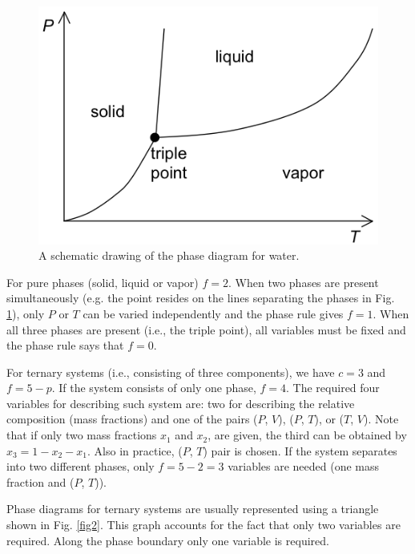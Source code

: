 \documentclass[byrevtex,amssymb,aps,pra,floatfix,letterpaper]{revtex4}
\begin{document}
\begin{figure}[!htp]
\begin{center}
\includegraphics[scale=0.5]{fig1}
\caption{A schematic drawing of the phase diagram for water.}
\label{fig1}
\end{center}
\end{figure}

For pure phases (solid, liquid or vapor) $f = 2$. When two phases are present simultaneously (e.g. the point resides on the lines separating the phases in Fig. \ref{fig1}), only $P$ or $T$ can be varied independently and the phase rule gives $f = 1$. When all three phases are present (i.e., the triple point), all variables must be fixed and the phase rule says that $f = 0$.

For ternary systems (i.e., consisting of three components), we have $c = 3$ and $f = 5 - p$. If the system consists of only one phase, $f = 4$. The required four variables for describing such system are: two for describing the relative composition (mass fractions) and one of the pairs ($P$, $V$), ($P$, $T$), or ($T$, $V$). Note that if only two mass fractions $x_1$ and $x_2$, are given, the third can be obtained by $x_3 = 1 - x_2 - x_1$. Also in practice, ($P$, $T$) pair is chosen. If the system separates into two different phases, only $f = 5 - 2 = 3$ variables are needed (one mass fraction and ($P$, $T$)).

Phase diagrams for ternary systems are usually represented using a triangle shown in Fig. \ref{fig2}. This graph accounts for the fact that only two variables are required. Along the phase boundary only one variable is required.
\end{document}
